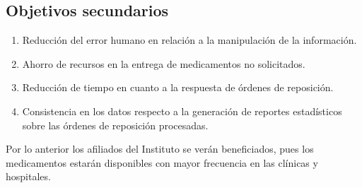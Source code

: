 \subsection{Objetivos secundarios}\label{sec:objetivos-secundarios}
\begin{enumerate}
\item Reducción del error humano en relación a la manipulación de la información.
\item Ahorro de recursos en la entrega de medicamentos no solicitados.
\item Reducción de tiempo en cuanto a la respuesta de órdenes de reposición.
\item Consistencia en los datos respecto a la generación de reportes estadísticos sobre las órdenes de reposición procesadas.
\end{enumerate}
Por lo anterior los afiliados del Instituto se verán beneficiados, pues los medicamentos estarán disponibles con mayor frecuencia en las clínicas y hospitales.

